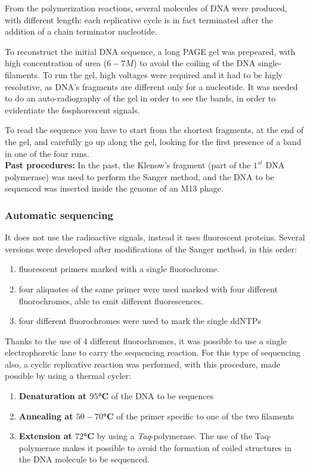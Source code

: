 From the polymerization reactions, several molecules of DNA were produced, with different length: each replicative cycle is in fact terminated after the addition of a chain terminator nucleotide.

To reconstruct the initial DNA sequence, a long PAGE gel was prepeared, with high concentration of urea ($6 - 7 M$) to avoid the coiling of the DNA single-filaments. To run the gel, high voltages were required and it had to be higly resolutive, as DNA's fragments are different only for a nucleotide. It was needed to do an auto-radiography of the gel in order to see the bands, in order to evidentiate the fosphorescent signals.

To read the sequence you have to start from the shortest fragments, at the end of the gel, and carefully go up along the gel, looking for the first presence of a band in one of the four runs. \\

\textbf{Past procedures: }In the past, the Klenow's fragment (part of the $1^{st}$ DNA polymerase) was used to perform the Sanger method, and the DNA to be sequenced was inserted inside the genome of an M13 phage.


\subsubsection{Automatic sequencing}
It does not use the radioactive signals, instead it uses fluorescent proteins. Several versions were developed after modifications of the Sanger method, in this order:

\begin{enumerate}
	\item fluorescent primers marked with a single fluorochrome.
	\item four aliquotes of the same primer were used marked with four different fluorochromes, able to emit different fluorescences.
	\item four different fluorochromes were used to mark the single ddNTPs
\end{enumerate}

Thanks to the use of 4 different fluorochromes, it was possible to use a single electrophoretic lane to carry the sequencing reaction. For this type of sequencing also, a cyclic replicative reaction was performed, with this procedure, made possible by using a thermal cycler:

\begin{enumerate}
	\item \textbf{Denaturation at $95$°C} of the DNA to be sequences
	\item \textbf{Annealing at $50-70$°C} of the primer specific to one of the two filaments
	\item \textbf{Extension at $72$°C} by using a \textit{Taq}-polymerase. The use of the Taq-polymerase makes it possible to avoid the formation of coiled structures in the DNA molecule to be sequenced.
\end{enumerate}

